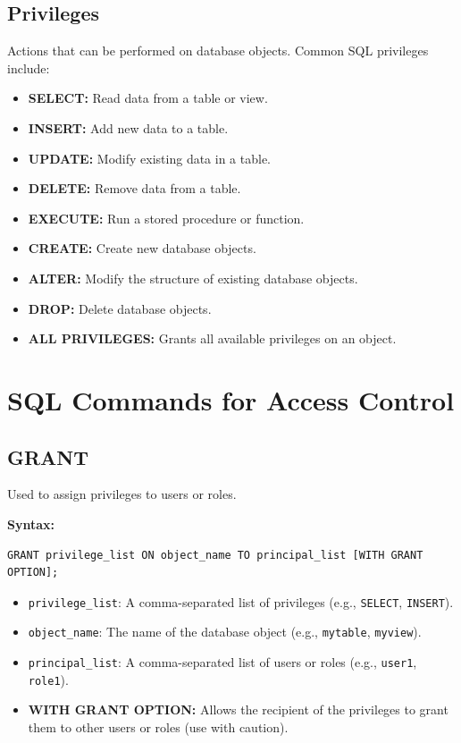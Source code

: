 \documentclass[12pt,a4paper]{article}
\begin{document}
\subsection{Privileges}
Actions that can be performed on database objects. Common SQL privileges include:
\begin{itemize}
    \item \textbf{SELECT:} Read data from a table or view.
    \item \textbf{INSERT:} Add new data to a table.
    \item \textbf{UPDATE:} Modify existing data in a table.
    \item \textbf{DELETE:} Remove data from a table.
    \item \textbf{EXECUTE:} Run a stored procedure or function.
    \item \textbf{CREATE:} Create new database objects.
    \item \textbf{ALTER:} Modify the structure of existing database objects.
    \item \textbf{DROP:} Delete database objects.
    \item \textbf{ALL PRIVILEGES:} Grants all available privileges on an object.
\end{itemize}

\section{SQL Commands for Access Control}

\subsection{GRANT}
Used to assign privileges to users or roles.

\textbf{Syntax:}
\begin{verbatim}
GRANT privilege_list ON object_name TO principal_list [WITH GRANT OPTION];
\end{verbatim}

\begin{itemize}
    \item \texttt{privilege\_list}: A comma-separated list of privileges (e.g., \texttt{SELECT}, \texttt{INSERT}).
    \item \texttt{object\_name}: The name of the database object (e.g., \texttt{mytable}, \texttt{myview}).
    \item \texttt{principal\_list}: A comma-separated list of users or roles (e.g., \texttt{user1}, \texttt{role1}).
    \item \textbf{WITH GRANT OPTION:} Allows the recipient of the privileges to grant them to other users or roles (use with caution).
\end{itemize}
\end{document}
